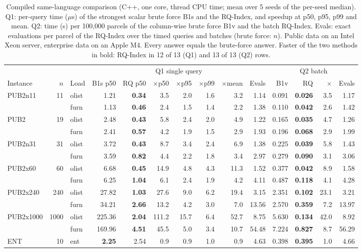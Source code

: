 \begin{table}[t]
\centering\footnotesize
\setlength{\tabcolsep}{3.4pt}
\caption{Compiled same-language comparison (C++, one core, thread CPU time; mean over 5 seeds of the per-seed median). Q1: per-query time ($\mu$s) of the strongest scalar brute force B1s and the RQ-Index, and speedup at p50, p95, p99 and mean. Q2: time (s) per 100{,}000 parcels of the column-wise brute force B1v and the batch RQ-Index. Evals: exact evaluations per parcel of the RQ-Index over the timed queries and batches (brute force: $n$). Public data on an Intel Xeon server, enterprise data on an Apple M4. Every answer equals the brute-force answer. Faster of the two methods in bold: RQ-Index in 12 of 13 (Q1) and 13 of 13 (Q2) rows.}
\label{tab:cpp}
\begin{tabular}{@{}lrlrrrrrrr|rrrr@{}}
\toprule
& & & \multicolumn{7}{c|}{Q1 single query} & \multicolumn{4}{c}{Q2 batch}\\
Instance & $n$ & Load & B1s p50 & RQ p50 & $\times$p50 & $\times$p95 & $\times$p99 & $\times$mean & Evals & B1v & RQ & $\times$ & Evals\\
\midrule
PUB2n11 & 11 & olist & 1.21 & \textbf{0.34} & 3.5 & 2.0 & 1.6 & 3.2 & 1.14 & 0.091 & \textbf{0.026} & 3.5 & 1.17\\
 &  & furn & 1.13 & \textbf{0.46} & 2.4 & 1.5 & 1.4 & 2.2 & 1.38 & 0.110 & \textbf{0.042} & 2.6 & 1.42\\
\midrule
PUB2 & 19 & olist & 2.48 & \textbf{0.43} & 5.8 & 2.4 & 2.0 & 4.9 & 1.22 & 0.165 & \textbf{0.035} & 4.7 & 1.26\\
 &  & furn & 2.41 & \textbf{0.57} & 4.2 & 1.9 & 1.5 & 2.9 & 1.93 & 0.196 & \textbf{0.068} & 2.9 & 1.99\\
\midrule
PUB2n31 & 31 & olist & 3.72 & \textbf{0.43} & 8.7 & 3.4 & 2.4 & 6.9 & 1.38 & 0.225 & \textbf{0.039} & 5.8 & 1.43\\
 &  & furn & 3.59 & \textbf{0.82} & 4.4 & 2.2 & 1.8 & 3.4 & 2.97 & 0.279 & \textbf{0.090} & 3.1 & 3.06\\
\midrule
PUB2x60 & 60 & olist & 6.68 & \textbf{0.45} & 14.9 & 4.8 & 4.3 & 11.3 & 1.52 & 0.377 & \textbf{0.042} & 8.9 & 1.58\\
 &  & furn & 6.25 & \textbf{1.04} & 6.1 & 2.4 & 1.9 & 4.2 & 4.11 & 0.487 & \textbf{0.118} & 4.1 & 4.28\\
\midrule
PUB2x240 & 240 & olist & 27.82 & \textbf{1.03} & 27.6 & 9.0 & 6.2 & 19.4 & 3.15 & 2.351 & \textbf{0.102} & 23.1 & 3.21\\
 &  & furn & 34.21 & \textbf{2.66} & 13.2 & 4.2 & 3.0 & 7.0 & 13.56 & 2.570 & \textbf{0.359} & 7.2 & 13.97\\
\midrule
PUB2x1000 & 1000 & olist & 225.36 & \textbf{2.04} & 111.2 & 15.7 & 6.4 & 52.7 & 8.75 & 5.630 & \textbf{0.134} & 42.0 & 8.92\\
 &  & furn & 169.96 & \textbf{4.51} & 45.5 & 5.0 & 3.4 & 10.7 & 54.48 & 7.224 & \textbf{0.827} & 8.7 & 56.29\\
\midrule
ENT & 10 & ent & \textbf{2.25} & 2.54 & 0.9 & 0.9 & 1.0 & 0.9 & 4.63 & 0.398 & \textbf{0.395} & 1.0 & 4.66\\
\bottomrule
\end{tabular}
\end{table}
